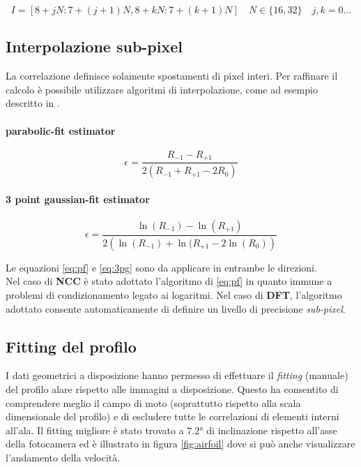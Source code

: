 \documentclass[a4paper]{article}
\begin{document}
\begin{equation}
I = \left[ 8+jN: 7+(j+1)N,8+kN: 7+(k+1)N\right] \quad N \in \{16,32 \} \quad j,k = 0 \ldots
\label{eq:int}
\end{equation}

\subsection{Interpolazione sub-pixel}

La correlazione definisce solamente spostamenti di pixel interi. Per raffinare il calcolo è possibile utilizzare algoritmi di interpolazione, come ad esempio descritto in \cite{spim}.

\paragraph{parabolic-fit estimator}

\begin{equation}
\epsilon =  \frac{R_{-1} - R_{+1} }{2\left( R_{-1} + R_{+1} -2 R_0   \right)}
\label{eq:pf}
\end{equation}



\paragraph{3 point gaussian-fit estimator}

\begin{equation}
\epsilon =  \frac{\ln(R_{-1}) - \ln(R_{+1}) }{2\left( \ln(R_{-1}) + \ln(R_{+1} -2 \ln(R_0)   \right)}
\label{eq:3pg}
\end{equation}

Le equazioni \ref{eq:pf} e \ref{eq:3pg} sono da applicare in entrambe le direzioni.\\
Nel caso di \textbf{NCC} è stato adottato l'algoritmo di \ref{eq:pf} in quanto immune a problemi di condizionamento legato ai logaritmi.
Nel caso di \textbf{DFT}, l'algoritmo adottato \cite{spdft} consente automaticamente di definire un livello di precisione \textit{sub-pixel}. 

\subsection{Fitting del profilo}

I dati geometrici a disposizione hanno permesso di effettuare il \textit{fitting} (manuale) del profilo alare rispetto alle immagini a disposizione. Questo ha consentito di comprendere meglio il campo di moto (soprattutto rispetto alla scala dimensionale del profilo) e di escludere tutte le correlazioni di elementi interni all'ala. Il fitting migliore è stato trovato a $7.2°$ di inclinazione rispetto all'asse della fotocamera ed è illustrato in figura \ref{fig:airfoil} dove si può anche visualizzare l'andamento della velocità.  
\end{document}
